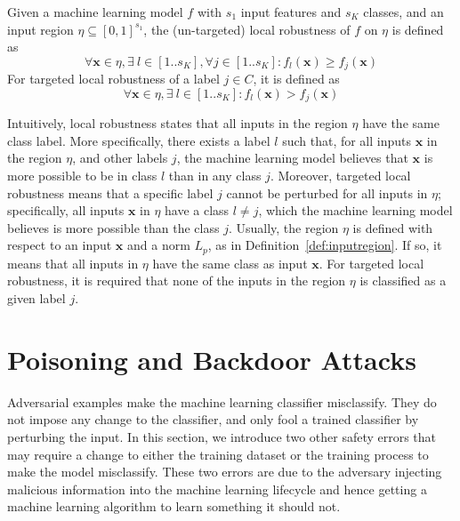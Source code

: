 \begin{definition}
	Given a machine learning model $f$ with $s_1$ input features and $s_K$ classes, and an input region $\eta\subseteq [0,1]^{s_1}$, the (un-targeted) local robustness of $f$ on $\eta$ is defined as 
\begin{equation}
\forall \textbf{x}\in \eta, \exists~ l\in [1..s_K], \forall j\in [1..s_K]: f_l(\textbf{x}) \geq f_{j}(\textbf{x})
\end{equation}
For targeted local robustness of a label $j\in C$, it is defined as 
\begin{equation}
\forall \textbf{x}\in \eta, \exists~ l\in [1..s_K]: f_l(\textbf{x}) > f_{j}(\textbf{x})
\end{equation}
\end{definition}


Intuitively, local robustness states that all inputs in the region $\eta$ have the same class label. More specifically, there exists a label $l$ such that, for all inputs $\textbf{x}$ in the region $\eta$, and other labels $j$, the machine learning model believes that $\textbf{x}$ is more possible to be in class $l$ than in any class $j$. Moreover, targeted local robustness means that a specific label $j$ cannot be perturbed for all inputs in $\eta$; specifically, all inputs $\textbf{x}$ in $\eta$ have a class $l \neq j$, which the machine learning model believes is more possible than the class $j$.  Usually, the region $\eta$ is defined with respect to an input $\textbf{x}$ and a norm $L_p$, as in Definition~\ref{def:inputregion}. If so, it means that all inputs in $\eta$ have the same class as input $\textbf{x}$. For targeted local robustness, it is required that none of the inputs in the region $\eta$ is classified as a given label $j$. 




\section{Poisoning and Backdoor Attacks}\label{sec:poisoningattackdefinition}

Adversarial examples make the machine learning classifier misclassify. They do not impose any change to the classifier, and only fool a trained classifier by perturbing the input. In this section, we introduce two other safety errors that may require a change to either the training dataset or the training process to make the model misclassify.  
These two errors are due to the adversary injecting malicious information into the machine learning lifecycle and hence getting a machine learning algorithm to learn something it should not. 


